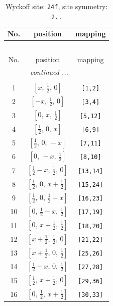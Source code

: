 \documentclass[fleqn,8pt]{jsarticle}
\begin{document}
\begin{longtable}{ccc}
\caption{Wyckoff site: {\tt 24f}, site symmetry: {\tt 2..}}
 \\
 \hline \hline
No. & position & mapping \\ \hline \endfirsthead

\multicolumn{2}{l}{\tablename\ \thetable{}} \\
 \hline \hline
No. & position & mapping \\ \hline \endhead

 \hline \hline
\multicolumn{2}{r}{\footnotesize\it continued ...} \\ \endfoot

 \hline \hline
\multicolumn{2}{r}{} \\ \endlastfoot

1 & $\left[ x,\, \frac{1}{2},\, 0 \right]$ & {\tt [1,2]} \\ \hline
2 & $\left[ - x,\, \frac{1}{2},\, 0 \right]$ & {\tt [3,4]} \\ \hline
3 & $\left[ 0,\, x,\, \frac{1}{2} \right]$ & {\tt [5,12]} \\ \hline
4 & $\left[ \frac{1}{2},\, 0,\, x \right]$ & {\tt [6,9]} \\ \hline
5 & $\left[ \frac{1}{2},\, 0,\, - x \right]$ & {\tt [7,11]} \\ \hline
6 & $\left[ 0,\, - x,\, \frac{1}{2} \right]$ & {\tt [8,10]} \\ \hline
7 & $\left[ \frac{1}{2} - x,\, \frac{1}{2},\, 0 \right]$ & {\tt [13,14]} \\ \hline
8 & $\left[ \frac{1}{2},\, 0,\, x + \frac{1}{2} \right]$ & {\tt [15,24]} \\ \hline
9 & $\left[ \frac{1}{2},\, 0,\, \frac{1}{2} - x \right]$ & {\tt [16,23]} \\ \hline
10 & $\left[ 0,\, \frac{1}{2} - x,\, \frac{1}{2} \right]$ & {\tt [17,19]} \\ \hline
11 & $\left[ 0,\, x + \frac{1}{2},\, \frac{1}{2} \right]$ & {\tt [18,20]} \\ \hline
12 & $\left[ x + \frac{1}{2},\, \frac{1}{2},\, 0 \right]$ & {\tt [21,22]} \\ \hline
13 & $\left[ x + \frac{1}{2},\, 0,\, \frac{1}{2} \right]$ & {\tt [25,26]} \\ \hline
14 & $\left[ \frac{1}{2} - x,\, 0,\, \frac{1}{2} \right]$ & {\tt [27,28]} \\ \hline
15 & $\left[ \frac{1}{2},\, x + \frac{1}{2},\, 0 \right]$ & {\tt [29,36]} \\ \hline
16 & $\left[ 0,\, \frac{1}{2},\, x + \frac{1}{2} \right]$ & {\tt [30,33]} \\ \hline

\end{longtable}
\end{document}

